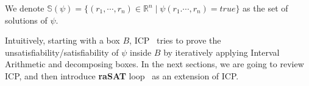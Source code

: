 \documentclass[runningheads,a4paper,oribibl]{llncs}
\newcommand{\Real}{{\mathbb R}}
\begin{document}
We denote ${\mathbb{S}(\psi) = \{(r_1,\cdots, r_n) \in \Real^n \mid
  \psi(r_1. \cdots, r_n)=true\}}$ as the set of solutions of $\psi$.

Intuitively, starting with a box $B$, ICP~\cite{benhamou:hal-00480814} tries to prove the unsatisfiability/satisfiability of $\psi$ inside $B$ by iteratively applying Interval Arithmetic and decomposing boxes. In the next sections, we are going to review ICP, and then introduce
\textbf{raSAT} loop~\cite{VanKhanh201227} as an extension of ICP. 

\end{document}
